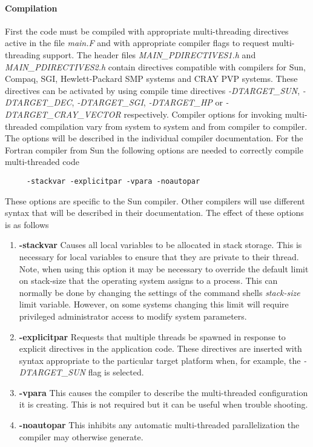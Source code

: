 \paragraph{Compilation}
First the code must be compiled with appropriate multi-threading directives 
active in the file {\em main.F} and with appropriate compiler flags
to request multi-threading support. The header files 
{\em MAIN\_PDIRECTIVES1.h} and {\em MAIN\_PDIRECTIVES2.h}
contain directives compatible with compilers for Sun, Compaq, SGI,
Hewlett-Packard SMP systems and CRAY PVP systems. These directives can be 
activated by using compile time
directives {\em -DTARGET\_SUN}, 
{\em -DTARGET\_DEC}, {\em -DTARGET\_SGI}, {\em -DTARGET\_HP}
or {\em -DTARGET\_CRAY\_VECTOR} respectively. Compiler options
for invoking multi-threaded compilation vary from system to system
and from compiler to compiler. The options will be described
in the individual compiler documentation. For the Fortran compiler 
from Sun the following options are needed to correctly compile
multi-threaded code
\begin{verbatim}
     -stackvar -explicitpar -vpara -noautopar
\end{verbatim}
These options are specific to the Sun compiler. Other compilers
will use different syntax that will be described in their
documentation. The effect of these options is as follows
\begin{enumerate}
\item {\bf -stackvar} Causes all local variables to be allocated in stack 
storage. This is necessary for local variables to ensure that they are private 
to their thread. Note, when using this option it may be necessary to override 
the default limit on stack-size that the operating system assigns to a process. 
This can normally be done by changing the settings of the command shells
{\em stack-size} limit variable. However, on some systems changing this limit
will require privileged administrator access to modify system parameters.

\item {\bf -explicitpar} Requests that multiple threads be spawned
in response to explicit directives in the application code. These
directives are inserted with syntax appropriate to the particular target
platform when, for example, the {\em -DTARGET\_SUN} flag is selected.

\item {\bf -vpara} This causes the compiler to describe the multi-threaded
configuration it is creating. This is not required
but it can be useful when trouble shooting.

\item {\bf -noautopar} This inhibits any automatic multi-threaded 
parallelization the compiler may otherwise generate.

\end{enumerate}


